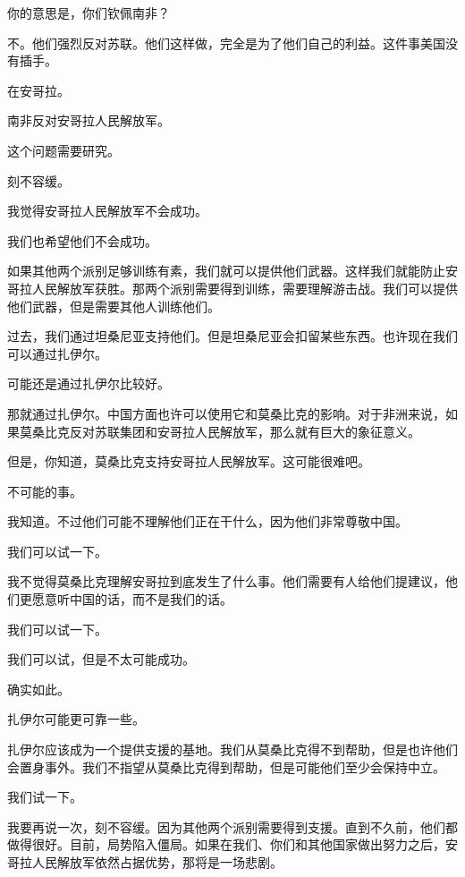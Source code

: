 你的意思是，你们钦佩南非？

不。他们强烈反对苏联。他们这样做，完全是为了他们自己的利益。这件事美国没有插手。

在安哥拉。

南非反对安哥拉人民解放军。

这个问题需要研究。

刻不容缓。

我觉得安哥拉人民解放军不会成功。

我们也希望他们不会成功。

如果其他两个派别足够训练有素，我们就可以提供他们武器。这样我们就能防止安哥拉人民解放军获胜。那两个派别需要得到训练，需要理解游击战。我们可以提供他们武器，但是需要其他人训练他们。

过去，我们通过坦桑尼亚支持他们。但是坦桑尼亚会扣留某些东西。也许现在我们可以通过扎伊尔。

可能还是通过扎伊尔比较好。

那就通过扎伊尔。中国方面也许可以使用它和莫桑比克的影响。对于非洲来说，如果莫桑比克反对苏联集团和安哥拉人民解放军，那么就有巨大的象征意义。

但是，你知道，莫桑比克支持安哥拉人民解放军。这可能很难吧。

不可能的事。

我知道。不过他们可能不理解他们正在干什么，因为他们非常尊敬中国。

我们可以试一下。

我不觉得莫桑比克理解安哥拉到底发生了什么事。他们需要有人给他们提建议，他们更愿意听中国的话，而不是我们的话。

我们可以试一下。

我们可以试，但是不太可能成功。

确实如此。

扎伊尔可能更可靠一些。

扎伊尔应该成为一个提供支援的基地。我们从莫桑比克得不到帮助，但是也许他们会置身事外。我们不指望从莫桑比克得到帮助，但是可能他们至少会保持中立。

我们试一下。

我要再说一次，刻不容缓。因为其他两个派别需要得到支援。直到不久前，他们都做得很好。目前，局势陷入僵局。如果在我们、你们和其他国家做出努力之后，安哥拉人民解放军依然占据优势，那将是一场悲剧。

